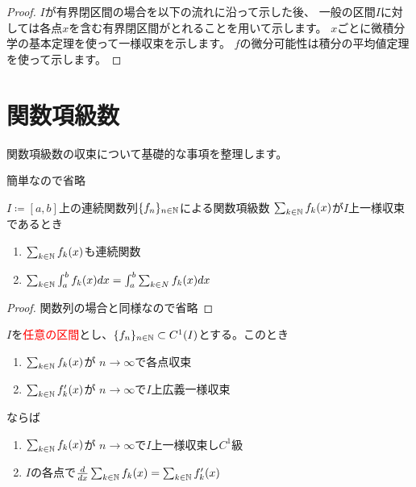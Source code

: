 \documentclass[report]{jlreq}
\begin{document}
\begin{proof}
    $I$が有界閉区間の場合を以下の流れに沿って示した後、
    一般の区間$I$に対しては各点$x$を含む有界閉区間がとれることを用いて示します。
    $x$ごとに微積分学の基本定理を使って一様収束を示します。
    $f$の微分可能性は積分の平均値定理を使って示します。
\end{proof}




%
\section{関数項級数}

関数項級数の収束について基礎的な事項を整理します。

\begin{definition}[関数項級数の収束]
    簡単なので省略
\end{definition}

\begin{proposition}[関数項級数の項別積分]
    $I \coloneqq [a, b]$上の連続関数列$\{ f_n \}_{n \in \mathbb{N}}$による関数項級数
    $\sum_{k \in \mathbb{N}} f_k(x)$が$I$上一様収束であるとき
    \begin{enumerate}
        \item $\sum_{k \in \mathbb{N}} f_k(x)$も連続関数
        \item $\sum_{k \in \mathbb{N}} \int_a^b f_k(x) dx = \int_a^b \sum_{k \in N} f_k(x) dx$
    \end{enumerate}
\end{proposition}

\begin{proof}
    関数列の場合と同様なので省略
\end{proof}

\begin{proposition}[関数項級数の項別微分]
    $I$を\textcolor{red}{任意の区間}とし、$\{ f_n \}_{n \in \mathbb{N}} \subset C^1(I)$とする。このとき
    \begin{enumerate}
        \item $\sum_{k \in \mathbb{N}} f_k(x)$が
            $n \to \infty$で各点収束
        \item $\sum_{k \in \mathbb{N}} f_k'(x)$が
            $n \to \infty$で$I$上広義一様収束
    \end{enumerate}
    ならば
    \begin{enumerate}
        \item $\sum_{k \in \mathbb{N}} f_k(x)$が
            $n \to \infty$で$I$上一様収束し$C^1$級
        \item $I$の各点で$\dd{x} \sum_{k \in \N} f_k(x) = \sum_{k \in \N} f_k'(x)$
    \end{enumerate}
\end{proposition}
\end{document}
